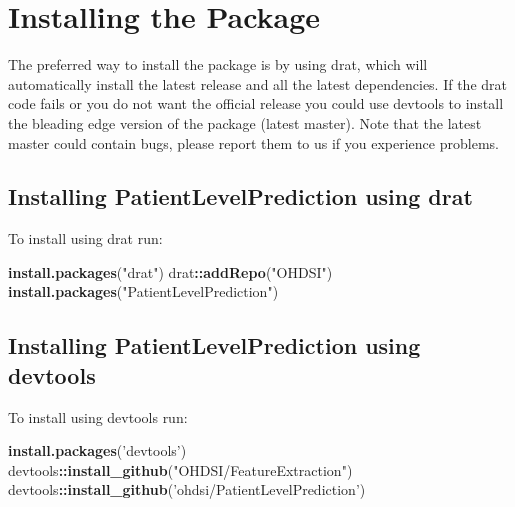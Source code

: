 \documentclass[
]{article}
\newenvironment{Shaded}{\begin{snugshade}}{\end{snugshade}}
\newcommand{\KeywordTok}[1]{\textcolor[rgb]{0.13,0.29,0.53}{\textbf{#1}}}
\newcommand{\NormalTok}[1]{#1}
\newcommand{\OperatorTok}[1]{\textcolor[rgb]{0.81,0.36,0.00}{\textbf{#1}}}
\newcommand{\StringTok}[1]{\textcolor[rgb]{0.31,0.60,0.02}{#1}}
\begin{document}
\hypertarget{installing-the-package}{%
\section{Installing the Package}\label{installing-the-package}}

The preferred way to install the package is by using drat, which will
automatically install the latest release and all the latest
dependencies. If the drat code fails or you do not want the official
release you could use devtools to install the bleading edge version of
the package (latest master). Note that the latest master could contain
bugs, please report them to us if you experience problems.

\hypertarget{installing-patientlevelprediction-using-drat}{%
\subsection{Installing PatientLevelPrediction using
drat}\label{installing-patientlevelprediction-using-drat}}

To install using drat run:

\begin{Shaded}
\begin{Highlighting}[]
\KeywordTok{install.packages}\NormalTok{(}\StringTok{"drat"}\NormalTok{)}
\NormalTok{drat}\OperatorTok{::}\KeywordTok{addRepo}\NormalTok{(}\StringTok{"OHDSI"}\NormalTok{)}
\KeywordTok{install.packages}\NormalTok{(}\StringTok{"PatientLevelPrediction"}\NormalTok{)}
\end{Highlighting}
\end{Shaded}

\hypertarget{installing-patientlevelprediction-using-devtools}{%
\subsection{Installing PatientLevelPrediction using
devtools}\label{installing-patientlevelprediction-using-devtools}}

To install using devtools run:

\begin{Shaded}
\begin{Highlighting}[]
\KeywordTok{install.packages}\NormalTok{(}\StringTok{'devtools'}\NormalTok{)}
\NormalTok{devtools}\OperatorTok{::}\KeywordTok{install_github}\NormalTok{(}\StringTok{"OHDSI/FeatureExtraction"}\NormalTok{)}
\NormalTok{devtools}\OperatorTok{::}\KeywordTok{install_github}\NormalTok{(}\StringTok{'ohdsi/PatientLevelPrediction'}\NormalTok{)}
\end{Highlighting}
\end{Shaded}
\end{document}
